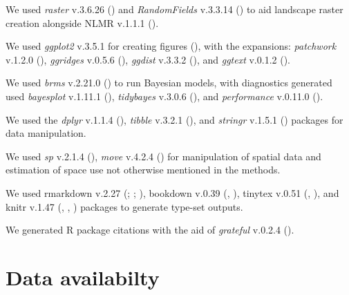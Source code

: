 \documentclass[10pt,a4paper]{article}
\begin{document}
We used \emph{raster} v.3.6.26 () and \emph{RandomFields} v.3.3.14 () to aid landscape raster creation alongside NLMR v.1.1.1 ().

We used \emph{ggplot2} v.3.5.1 for creating figures (), with the expansions: \emph{patchwork} v.1.2.0 (), \emph{ggridges} v.0.5.6 (), \emph{ggdist} v.3.3.2 (), and \emph{ggtext} v.0.1.2 ().

We used \emph{brms} v.2.21.0 () to run Bayesian models, with diagnostics generated used \emph{bayesplot} v.1.11.1 (), \emph{tidybayes} v.3.0.6 (), and \emph{performance} v.0.11.0 ().

We used the \emph{dplyr} v.1.1.4 (), \emph{tibble} v.3.2.1 (),
and \emph{stringr} v.1.5.1 () packages for data manipulation.

We used \emph{sp} v.2.1.4 (), \emph{move} v.4.2.4 () for manipulation of spatial data and estimation of space use not otherwise mentioned in the methods.

We used rmarkdown v.2.27 (; ; ), bookdown v.0.39 (, ), tinytex v.0.51 (, ), and knitr v.1.47 (, , ) packages to generate type-set outputs.

We generated R package citations with the aid of \emph{grateful} v.0.2.4 ().

\section{Data availabilty}\label{data-availabilty}
\end{document}
